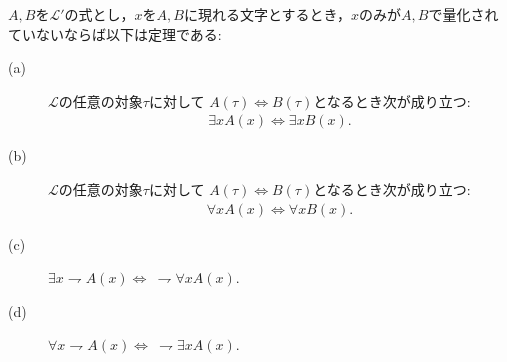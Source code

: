 	
	\begin{screen}
		\begin{logicalthm}[量化記号の性質(イ)]\label{logicalthm:properties_of_quantifiers}
			$A,B$を$\mathcal{L}'$の式とし，$x$を$A,B$に現れる文字とするとき，$x$のみが$A,B$で量化されていないならば以下は定理である:
			\begin{description}
				\item[(a)] $\mathcal{L}$の任意の対象$\tau$に対して
					$A(\tau) \Longleftrightarrow B(\tau)$となるとき次が成り立つ:
					\begin{align}
						\exists x A(x) \Longleftrightarrow \exists x B(x).
					\end{align}
				
				\item[(b)] $\mathcal{L}$の任意の対象$\tau$に対して
					$A(\tau) \Longleftrightarrow B(\tau)$となるとき次が成り立つ:
					\begin{align}
						\forall x A(x) \Longleftrightarrow \forall x B(x).
					\end{align}
					
				\item[(c)] $\exists x \rightharpoondown A(x) \Longleftrightarrow\ \rightharpoondown \forall x A(x)$.
				
				\item[(d)] $\forall x \rightharpoondown A(x) \Longleftrightarrow\ \rightharpoondown \exists x A(x)$.
			\end{description}
		\end{logicalthm}
	\end{screen}
	

